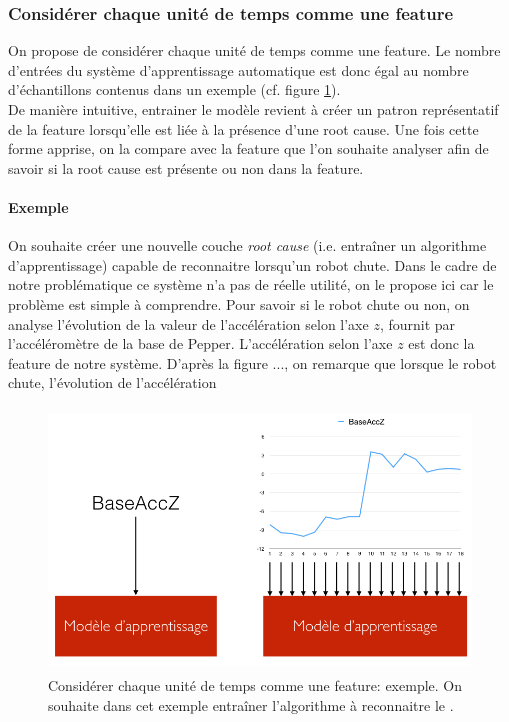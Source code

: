 \subsubsection{Considérer chaque unité de temps comme une feature}
\label{Automatisation du processus d'investigation: Reconnaissance de motifs: Différentes approches étudiées: Considérer chaque unité de temps comme une feature}
On propose de considérer chaque unité de temps comme une feature. Le nombre d'entrées du système d'apprentissage automatique est donc égal au nombre d'échantillons contenus dans un exemple (cf. figure \ref{fig:Considérer chaque unité de temps comme une feature: exemple}). \\
De manière intuitive, entrainer le modèle revient à créer un patron représentatif de la feature lorsqu'elle est liée à la présence d'une root cause. Une fois cette forme apprise, on la compare avec la feature que l'on souhaite analyser afin de savoir si la root cause est présente ou non dans la feature.
\newline

\paragraph{Exemple} On souhaite créer une nouvelle couche \emph{root cause} (i.e. entraîner un algorithme d'apprentissage) capable de reconnaitre lorsqu'un robot chute. Dans le cadre de notre problématique ce système n'a pas de réelle utilité, on le propose ici car le problème est simple à comprendre. 
Pour savoir si le robot chute ou non, on analyse l'évolution de la valeur de l'accélération selon l'axe $z$, fournit par l'accéléromètre de la base de Pepper. L'accélération selon l'axe $z$ est donc la feature de notre système. D'après la figure ..., on remarque que lorsque le robot chute, l'évolution de l'accélération

\begin{figure}[h]
	\centering\includegraphics[height=7cm]{images/unit_tps_feature.png}
	\caption[Considérer chaque unité de temps comme une feature: exemple]{Considérer chaque unité de temps comme une feature: exemple. On souhaite dans cet exemple entraîner l'algorithme à reconnaitre le .}
	\label{fig:Considérer chaque unité de temps comme une feature: exemple}
\end{figure}

